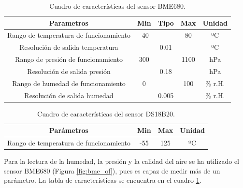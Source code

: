 \begin{table}[H]
\begin{center}
\begin{tabular}{|c|c|c|c|c|}
\hline
\textbf{Parametros} & \textbf{Min}  & \textbf{Tipo}  & \textbf{Max}  & \textbf{Unidad}\\
\hline
Rango de temperatura de funcionamiento & -40 &  & 80 & ºC \\
Resolución de salida temperatura &  & 0.01 &  &ºC \\
Rango de presión de funcionamiento & 300 &  & 1100 & hPa \\
Resolución de salida presión &  & 0.18 &  &hPa \\
Rango de humedad de funcionamiento & 0 &  & 100 & \% r.H. \\
Resolución de salida humedad &  & 0.005 &  &\% r.H.  \\
\hline
\end{tabular}
\caption{Cuadro de características del sensor BME680.}
\label{cuadro:bme_tabla}
\end{center}
\end{table}

\begin{table}[H]
\begin{center}
\begin{tabular}{|c|c|c|c|}
\hline
\textbf{Parámetros} & \textbf{Min} & \textbf{Max}  & \textbf{Unidad}\\
\hline
Rango de temperatura de funcionamiento  & -55 & 125 & ºC \\
\hline
\end{tabular}
\caption{Cuadro de características del sensor DS18B20.}
\label{cuadro:ds_tabla}
\end{center}
\end{table}

Para la lectura de la humedad, la presión y la calidad del aire se ha utilizado el sensor BME680 (Figura \ref{fig:bme_of}), pues es capaz de medir más de un parámetro. La tabla de características se encuentra en el cuadro \ref{cuadro:bme_tabla}.\\


